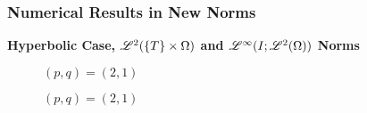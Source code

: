 \begin{frame}
    \frametitle{Numerical Results in New Norms}

    \vspace*{\fill}
    \begin{center}
        {\color{\accentcolor} \Large \textbf{Hyperbolic Case, $\mathscr{L}^{2}(\left\{ T \right\} \times \Omega)$ and $\mathscr{L}^{\infty}(I; \mathscr{L}^{2}(\Omega))$ Norms}}
    \end{center}

    \vspace*{\fill}

    \begin{multicols}{2}

        \begin{center}
            \begin{minipage}{0.4\textwidth}
                \begin{figure}[!ht]
                    \caption{$\left( p, q  \right) = \left( 2, 1  \right)$}
                    \label{fig:p_2_1_hyp_l2T}
                    
                \end{figure}
            \end{minipage}
        \end{center}

        \vfill\null
        \columnbreak

        \begin{center}
            \begin{minipage}{0.4\textwidth}
                \begin{figure}[!ht]
                    \caption{$\left( p, q  \right) = \left( 2, 1  \right)$}
                    \label{fig:p_2_1_hyp_linfl2}
                    
                \end{figure}
            \end{minipage}
        \end{center}

    \end{multicols}
    \vspace*{\fill}
    
\end{frame}